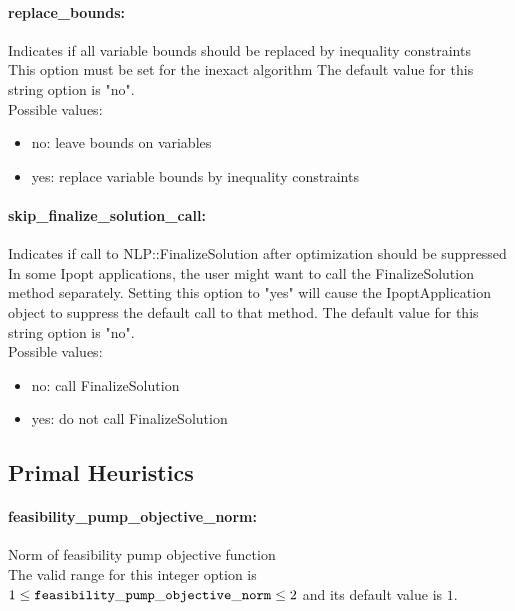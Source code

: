 \paragraph{replace\_bounds:}\label{opt:replace_bounds} Indicates if all variable bounds should be replaced by inequality constraints \\
 This option must be set for the inexact algorithm The default value for this string option is "no".
\\ 
Possible values:
\begin{itemize}
   \item no: leave bounds on variables
   \item yes: replace variable bounds by inequality constraints
\end{itemize}

\paragraph{skip\_finalize\_solution\_call:}\label{opt:skip_finalize_solution_call} Indicates if call to NLP::FinalizeSolution after optimization should be suppressed \\
 In some Ipopt applications, the user might want to call the FinalizeSolution method separately.  Setting this option to "yes" will cause the IpoptApplication object to suppress the default call to that method. The default value for this string option is "no".
\\ 
Possible values:
\begin{itemize}
   \item no: call FinalizeSolution
   \item yes: do not call FinalizeSolution
\end{itemize}

\subsection{Primal Heuristics}
\label{sec:PrimalHeuristics}
\paragraph{feasibility\_pump\_objective\_norm:}\label{opt:feasibility_pump_objective_norm} Norm of feasibility pump objective function \\
 The valid range for this integer option is
$1 \le {\tt feasibility\_pump\_objective\_norm } \le 2$
and its default value is $1$.


